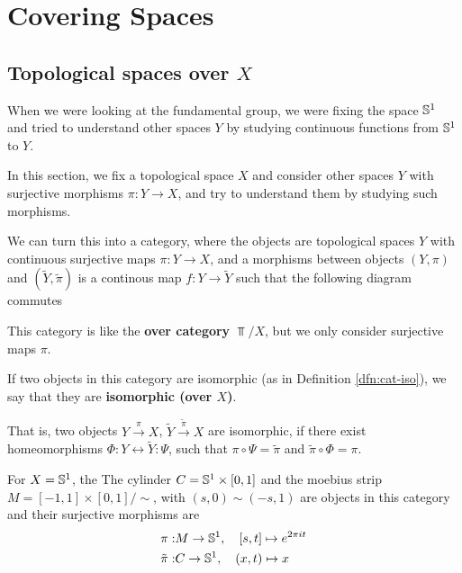 \section{Covering Spaces}
\subsection{Topological spaces over $X$}
When we were looking at the fundamental group, we were fixing the space $\mathbb{S}^{1}$ and tried to understand other spaces $Y$ by studying continuous functions from $\mathbb{S}^{1}$ to $Y$.

In this section, we fix a topological space $X$ and consider other spaces $Y$ with surjective morphisms $\pi: Y \to  X$, and try to understand them by studying such morphisms.

We can turn this into a category, where the objects are topological spaces $Y$ with continuous surjective maps $\pi: Y \to X$, and a morphisms between objects $(Y, \pi)$ and $(\tilde{Y}, \tilde{\pi})$ is a continous map $f: Y \to  \tilde{Y}$ such that the following diagram commutes
\begin{center}
\end{center}
This category is like the \textbf{over category} $\Top/X$, but we only consider surjective maps $\pi$.

\begin{dfn}[]
  If two objects in this category are isomorphic (as in Definition \ref{dfn:cat-iso}),
  we say that they are \textbf{isomorphic (over $X$)}.

  That is, two objects $Y \stackrel{\pi}{\to}X$, $\tilde{Y} \stackrel{\tilde{\pi}}{\to}X$ are isomorphic, if there exist homeomorphisms $\Phi:Y \leftrightarrow \tilde{Y}: \Psi$, such that $\pi \circ \Psi = \tilde{\pi}$ and $\tilde{\pi} \circ \Phi = \pi$.
\end{dfn}

\begin{ex}[]
  For $X = \mathbb{S}^{1}$, the
  The cylinder $C = \mathbb{S}^{1} \times [0,1]$ and the moebius strip $M= [-1,1] \times [0,1]/\sim$, with $(s,0) \sim (-s,1)$
  are objects in this category and their surjective morphisms are 
  \begin{align*}
    \pi: &M \to \mathbb{S}^{1}, \quad [s,t] \mapsto  e^{2 \pi i t}\\
    \tilde{\pi}: &C \to \mathbb{S}^{1}, \quad (x,t) \mapsto x
  \end{align*}
\end{ex}

